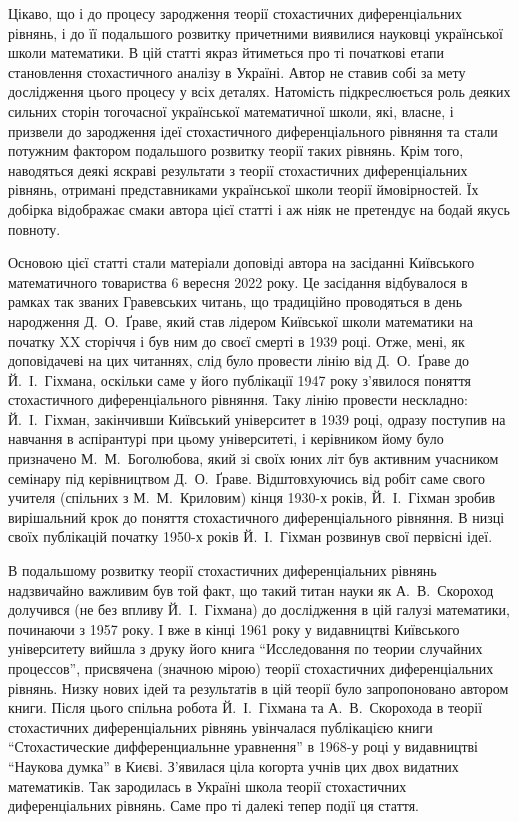 \documentclass[11pt, reqno]{amsart}
\begin{document}
Цікаво, що і до процесу зародження теорії стохастичних диференціальних рівнянь, і до її подальшого розвитку причетними виявилися науковці української школи математики. В цій статті якраз йтиметься про ті початкові етапи становлення стохастичного аналізу в Україні. Автор не ставив собі за мету дослідження цього процесу у всіх деталях. Натомість підкреслюється роль деяких сильних сторін тогочасної української  математичної школи, які, власне, і призвели до зародження ідеї стохастичного диференціального рівняння та стали потужним фактором подальшого розвитку теорії таких рівнянь. Крім того, наводяться деякі яскраві результати з теорії стохастичних диференціальних рівнянь, отримані представниками української школи теорії ймовірностей. Їх добірка відображає смаки автора цієї статті і аж ніяк не претендує на бодай якусь повноту.

Основою цієї статті стали матеріали доповіді автора на засіданні Київського математичного товариства 6 вересня 2022 року. Це засідання відбувалося в рамках так званих Гравевських читань, що традиційно проводяться в день народження Д.~О.~Ґраве, який став лідером Київської школи математики на початку XX сторіччя і був ним до своєї смерті в 1939 році. Отже, мені, як доповідачеві на цих читаннях, слід було провести лінію від Д.~О.~Ґраве до Й.~І.~Гіхмана, оскільки саме у його публікації 1947 року з'явилося поняття стохастичного диференціального рівняння. Таку лінію провести нескладно: Й.~І.~Гіхман, закінчивши Київський університет в 1939 році, одразу поступив на навчання в аспірантурі при цьому університеті, і керівником йому було призначено М.~М.~Боголюбова, який зі своїх юних літ був активним учасником семінару під керівництвом Д.~О.~Ґраве. Відштовхуючись від робіт саме свого учителя (спільних з М.~М.~Криловим) кінця 1930-х років, Й.~І.~Гіхман зробив вирішальний крок до поняття стохастичного диференціального рівняння. В низці своїх публікацій початку 1950-х років Й.~І.~Гіхман розвинув свої первісні ідеї.

В подальшому розвитку теорії стохастичних диференціальних рівнянь надзвичайно важливим був той факт, що такий титан науки як А.~В.~Скороход долучився (не без впливу Й.~І.~Гіхмана) до дослідження в цій галузі математики, починаючи з 1957 року. І вже в кінці 1961 року у видавництві Київського університету вийшла з друку його книга ``Исследовання по теории случайних процессов'', присвячена (значною мірою) теорії стохастичних диференціальних рівнянь. Низку нових ідей та результатів в цій теорії було запропоновано автором книги. Після цього спільна робота Й.~І.~Гіхмана та А.~В.~Скорохода в теорії стохастичних диференціальних рівнянь увінчалася публікацією книги ``Стохастические дифференциальнне уравнення'' в 1968-у році у видавництві ``Наукова думка'' в Києві. З'явилася ціла когорта учнів цих двох видатних математиків. Так зародилась в Україні школа теорії стохастичних диференціальних рівнянь. Саме про ті далекі тепер події ця стаття.
\end{document}
